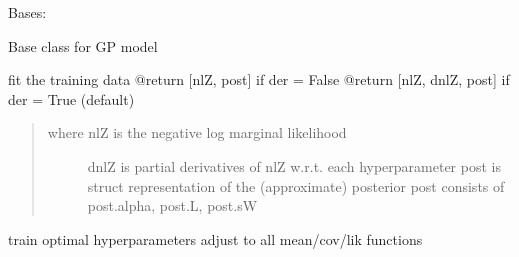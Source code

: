 \documentclass[letterpaper,10pt,english]{sphinxmanual}
\begin{document}
\begin{fulllineitems}
\label{pyGPs.Core:pyGPs.Core.gp.GP}
Bases: 

Base class for GP model

\begin{fulllineitems}
\label{pyGPs.Core:pyGPs.Core.gp.GP.fit}
fit the training data
@return  {[}nlZ, post{]}        if der = False
@return  {[}nlZ, dnlZ, post{]}  if der = True (default)
\begin{quote}
\begin{description}
\item[{where nlZ  is the negative log marginal likelihood}] \leavevmode
dnlZ is partial derivatives of nlZ w.r.t. each hyperparameter
post is struct representation of the (approximate) posterior
post consists of post.alpha, post.L, post.sW

\end{description}
\end{quote}

\end{fulllineitems}


\begin{fulllineitems}
\label{pyGPs.Core:pyGPs.Core.gp.GP.optimize}
train optimal hyperparameters 
adjust to all mean/cov/lik functions

\end{fulllineitems}


\begin{fulllineitems}
\label{pyGPs.Core:pyGPs.Core.gp.GP.plotData_1d}
\end{fulllineitems}


\begin{fulllineitems}
\label{pyGPs.Core:pyGPs.Core.gp.GP.plotData_2d}
\end{fulllineitems}


\end{fulllineitems}
\end{document}
